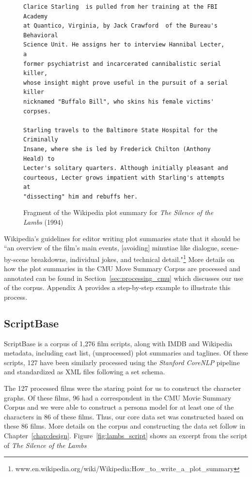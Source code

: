 \documentclass[bsc,frontabs,singlespacing,parskip, twoside]{infthesis}
\begin{document}
\begin{figure}[h!]
\centering
\begin{minipage}{14.5cm}
\begin{Verbatim}[frame=single]
Clarice Starling  is pulled from her training at the FBI Academy 
at Quantico, Virginia, by Jack Crawford  of the Bureau's Behavioral
Science Unit. He assigns her to interview Hannibal Lecter, a 
former psychiatrist and incarcerated cannibalistic serial killer, 
whose insight might prove useful in the pursuit of a serial killer
nicknamed "Buffalo Bill", who skins his female victims' corpses.

Starling travels to the Baltimore State Hospital for the Criminally 
Insane, where she is led by Frederick Chilton (Anthony Heald) to 
Lecter's solitary quarters. Although initially pleasant and 
courteous, Lecter grows impatient with Starling's attempts at 
"dissecting" him and rebuffs her.
\end{Verbatim}
\end{minipage}
\caption{Fragment of the Wikipedia plot summary for \textit{The Silence of the Lambs} (1994)}
\label{fig:lambs_summary}
\end{figure}


Wikipedia's guidelines for editor writing plot summaries state that it should be ``an overview of the film's main events, [avoiding] minutiae like dialogue, scene-by-scene breakdowns, individual jokes, and technical detail."\footnote{www.en.wikipedia.org/wiki/Wikipedia:How\_to\_write\_a\_plot\_summary} More details on how the plot summaries in the CMU Move Summary Corpus are processed and annotated can be found in Section~\ref{sec:processing_cmu} which discusses our use of the corpus. Appendix A provides a step-by-step example to illustrate this process.


\subsection{ScriptBase}
ScriptBase \cite{Gorinski2015} is a corpus of 1,276 film scripts, along with IMDB and Wikipedia metadata, including cast list, (unprocessed) plot summaries and taglines. Of these scripts, 127 have been similarly processed using the \textit{Stanford CoreNLP} pipeline and standardized as XML files following a set schema.

The 127 processed films were the staring point for us to construct the character graphs. Of these films, 96 had a correspondent in the CMU Movie Summary Corpus and we were able to construct a persona model for at least one of the characters in 86 of these films. Thus, our core data set was constructed based on these 86 films. More details on the corpus and constructing the data set follow in Chapter~\ref{chap:design}. Figure~\ref{fig:lambs_script} shows an excerpt from the script of \textit{The Silence of the Lambs}
\end{document}
